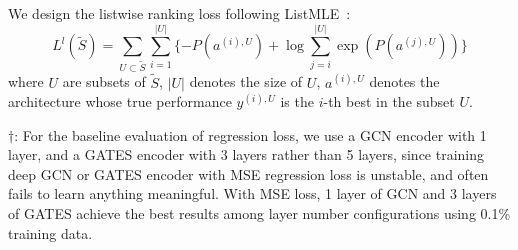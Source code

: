 \documentclass[runningheads]{llncs}
\begin{document}
We design the listwise ranking loss following ListMLE~\cite{xia2008listwise}:
\begin{equation}
    L^l(\tilde{S}) = \sum_{U \subset \tilde{S}} \sum_{i=1}^{|U|} \{-P(a^{(i), U}) + \log\sum_{j=i}^{|U|} \exp(P(a^{(j), U}))\}
\end{equation}
where $U$ are subsets of $\tilde{S}$, $|U|$ denotes the size of $U$, $a^{(i), U}$ denotes the architecture whose true performance $y^{(i), U}$ is the $i$-th best in the subset $U$.


\begin{table*}[bt]
  \caption{The Kendall’s Tau of using different loss functions on NAS-Bench-101. The first 90\% (381262) architectures in the dataset are used as the training data, and the other 42362 architectures are used as the testing data. All experiments except ``Regression (MSE) + GCN'' are carried out with GATES encoder.}
  \label{table:rank-nb101}
  \begin{center}
    \begin{minipage}{1.0\textwidth}
$\dagger$: For the baseline evaluation of regression loss, we use a GCN encoder with 1 layer, and a GATES encoder with 3 layers rather than 5 layers, since training deep GCN or GATES encoder with MSE regression loss is unstable, and often fails to learn anything meaningful. With MSE loss, 1 layer of GCN and 3 layers of GATES achieve the best results among layer number configurations using 0.1\% training data.
\end{minipage}
  \end{center}
\end{table*}
\end{document}
